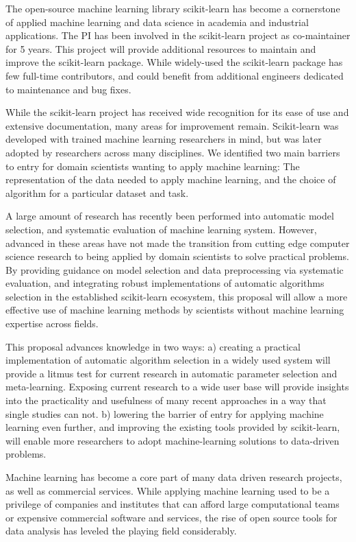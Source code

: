 The open-source machine learning library scikit-learn has become a cornerstone of
applied machine learning and data science in academia and industrial applications.
The PI has been involved in the scikit-learn project as co-maintainer for 5 years.
This project will provide additional resources to maintain and improve the
scikit-learn package.
While widely-used the scikit-learn package has few full-time contributors, and
could benefit from additional engineers dedicated to maintenance and bug fixes.

While the scikit-learn project has received wide recognition for its ease of
use and extensive documentation, many areas for improvement remain.
Scikit-learn was developed with trained machine learning researchers in mind,
but was later adopted by researchers across many disciplines.
We identified two main barriers to entry for domain scientists wanting to apply
machine learning:
The representation of the data needed to apply machine learning, and the choice
of algorithm for a particular dataset and task.

A large amount of research has recently been performed into automatic model
selection, and systematic evaluation of machine learning system.
However, advanced in these areas have not made the transition from cutting edge
computer science research to being applied by domain scientists to solve practical
problems.
By providing guidance on model selection and data preprocessing via
systematic evaluation, and integrating robust implementations of automatic
algorithms selection in the established scikit-learn ecosystem, this proposal
will allow a more effective use of machine learning methods by scientists
without machine learning expertise across fields.

This proposal advances knowledge in two ways:
a) creating a practical implementation of automatic algorithm selection in a
widely used system will provide a litmus test for current research in automatic
parameter selection and meta-learning. Exposing current research to a wide user base
will provide insights into the practicality and usefulness of many recent approaches
in a way that single studies can not.
b) lowering the barrier of entry for applying machine learning even further,
and improving the existing tools provided by scikit-learn, will enable more
researchers to adopt machine-learning solutions to data-driven problems.


Machine learning has become a core part of many data driven research projects,
as well as commercial services. While applying machine learning used to be
a privilege of companies and institutes that can afford large computational
teams or expensive commercial software and services, the rise of open
source tools for data analysis has leveled the playing field considerably.

